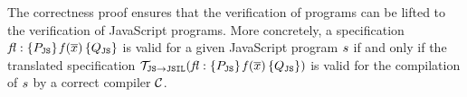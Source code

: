 The correctness proof ensures that the verification of \jsil programs can be lifted to the verification of JavaScript programs.
%
More concretely, a \javert  specification ${\mathit{fl}} : \{ P_{\mathtt{JS}} \} \, \mathit{f}(\overline{x}) \, \{ Q_{\mathtt{JS}} \}$
is valid for a given JavaScript program $s$ if and only if the translated specification 
$\mathcal{T}_{\mathtt{JS}\rightarrow\mathtt{JSIL}}({\mathit{fl}} : \{ P_{\mathtt{JS}} \} \, \mathit{f}(\overline{x}) \, \{ Q_{\mathtt{JS}} \})$ is valid 
for the compilation of $s$ by a correct compiler $\mathcal{C}$. 






%
%
%



